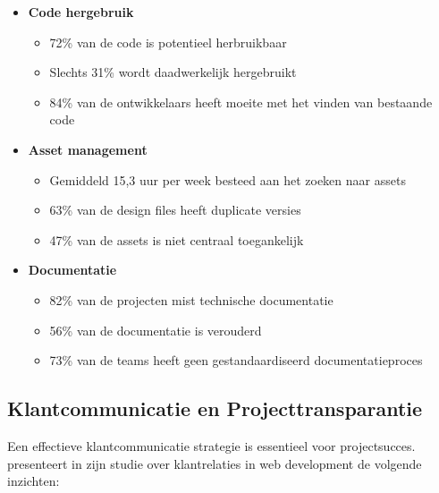 \begin{itemize}
    \item \textbf{Code hergebruik}
    \begin{itemize}
        \item 72\% van de code is potentieel herbruikbaar
        \item Slechts 31\% wordt daadwerkelijk hergebruikt
        \item 84\% van de ontwikkelaars heeft moeite met het vinden van bestaande code
    \end{itemize}
    
    \item \textbf{Asset management}
    \begin{itemize}
        \item Gemiddeld 15,3 uur per week besteed aan het zoeken naar assets
        \item 63\% van de design files heeft duplicate versies
        \item 47\% van de assets is niet centraal toegankelijk
    \end{itemize}
    
    \item \textbf{Documentatie}
    \begin{itemize}
        \item 82\% van de projecten mist technische documentatie
        \item 56\% van de documentatie is verouderd
        \item 73\% van de teams heeft geen gestandaardiseerd documentatieproces
    \end{itemize}
\end{itemize}

\subsection{Klantcommunicatie en Projecttransparantie}
\label{subsec:klant-communicatie}

Een effectieve klantcommunicatie strategie is essentieel voor projectsucces. \textcite{Wang2024} presenteert in zijn studie over klantrelaties in web development de volgende inzichten:

